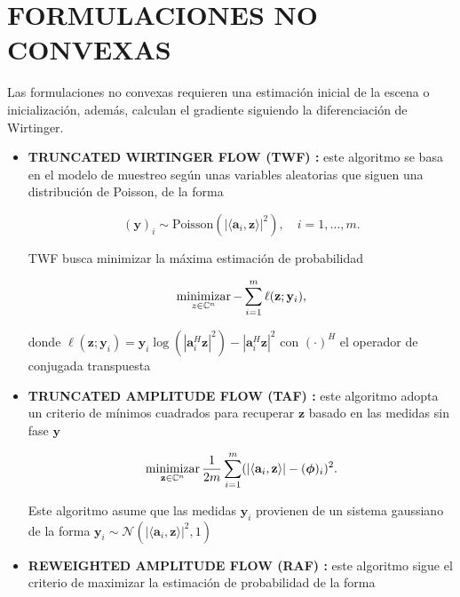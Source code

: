 \section{FORMULACIONES NO CONVEXAS}
Las formulaciones no convexas requieren una estimación inicial de la escena o inicialización, además, calculan el gradiente siguiendo la diferenciación de Wirtinger.
\begin{itemize}
    \item \textbf{TRUNCATED WIRTINGER FLOW (TWF) :} este algoritmo se basa en el modelo de muestreo según unas variables aleatorias que siguen una distribución de Poisson, de la forma
    
    \begin{equation}
        (\mathbf{y})_i\sim \mathrm{Poisson}( \vert \langle \mathbf{a}_i,\mathbf{z}\rangle \vert^2 ), \quad i=1,\dots,m.
    \end{equation}
    
    TWF busca minimizar la máxima estimación de probabilidad 
    
    \begin{equation}
        \operatorname*{minimizar}_{z \in \mathbb{C}^{n}} - \sum_{i=1}^{m} \ell(\mathbf{z};\mathbf{y}_i),
    \end{equation}
    
    donde $\ell(\mathbf{z};\mathbf{y}_i) = { \mathbf{y}_i\log(|\mathbf{a}_i^H \mathbf{z}|^2) -|\mathbf{a}_i^H \mathbf{z}|^2 }$ con $(\cdot)^H$ el operador de conjugada transpuesta
    
    \item \textbf{TRUNCATED AMPLITUDE FLOW (TAF) :} este algoritmo adopta un criterio de mínimos cuadrados para recuperar $\mathbf{z}$ basado en las medidas sin fase $\mathbf{y}$ 
    
    \begin{equation}
        \operatorname*{minimizar}_{\mathbf{z} \in \mathbb{C}^{n}} \frac{1}{2m} \sum_{i=1}^{m} (\vert \langle \mathbf{a}_i,\mathbf{z}\rangle \vert - (\boldsymbol{\phi})_i)^2.
    \end{equation}
    
    Este algoritmo asume que las medidas $\mathbf{y}_i$ provienen de un sistema gaussiano de la forma $\mathbf{y}_i \sim \mathcal{N}(\vert \langle \mathbf{a}_i,\mathbf{z}\rangle \vert^2, 1)$
    
    \item \textbf{REWEIGHTED AMPLITUDE FLOW (RAF) :} este algoritmo sigue el criterio de maximizar la estimación de probabilidad de la forma
    

\end{itemize}
